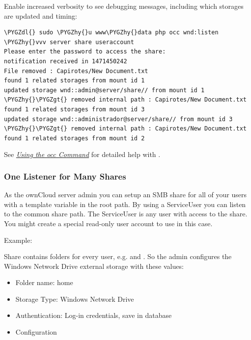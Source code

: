\documentclass[letterpaper,10pt,english]{sphinxmanual}
\def\PYGZgt{\char`\>}
\def\PYGZdl{\char`\$}
\def\PYGZhy{\char`\-}
\begin{document}
Enable increased verbosity to see debugging messages, including which storages are updated and timing:

\begin{Verbatim}[commandchars=\\\{\}]
\PYGZdl{} sudo \PYGZhy{}u www\PYGZhy{}data php occ wnd:listen \PYGZhy{}vvv server share useraccount
Please enter the password to access the share:
notification received in 1471450242
File removed : Capirotes/New Document.txt
found 1 related storages from mount id 1
updated storage wnd::admin@server/share// from mount id 1 \PYGZhy{}\PYGZgt{} removed internal path : Capirotes/New Document.txt
found 1 related storages from mount id 3
updated storage wnd::administrador@server/share// from mount id 3 \PYGZhy{}\PYGZgt{} removed internal path : Capirotes/New Document.txt
found 1 related storages from mount id 2
\end{Verbatim}

See {\hyperref[configuration_server/occ_command::doc]{\emph{\emph{Using the occ Command}}}} for detailed help with .


\subsubsection{One Listener for Many Shares}
\label{enterprise_external_storage/windows-network-drive_configuration:one-listener-for-many-shares}
As the ownCloud server admin you can setup an SMB share for all of your users with a 
template variable in the root path. By using a ServiceUser you can listen to the common share path. The ServiceUser is any user with access to the share. You might create a special read-only user account to use in this case.

Example:

Share  contains folders for every user, e.g. 
and . So the admin configures the Windows Network Drive external storage with these values:
\begin{itemize}
\item {} 
Folder name: home

\item {} 
Storage Type: Windows Network Drive

\item {} 
Authentication: Log-in credentials, save in database

\item {} 
Configuration

\end{itemize}
\end{document}
